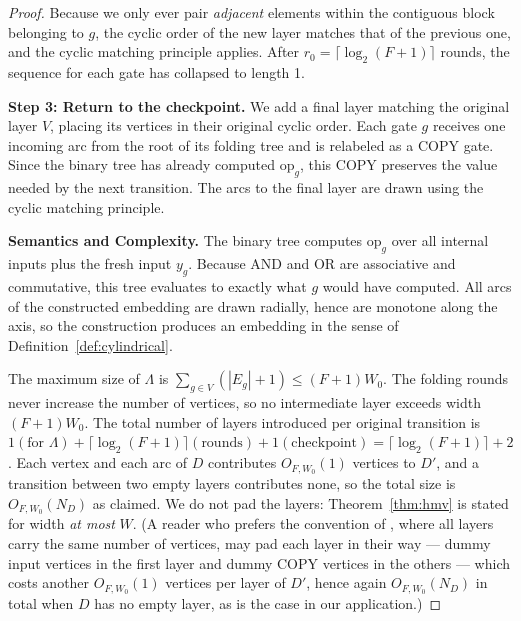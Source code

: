 \documentclass[11pt]{article}
\theoremstyle{definition}
\theoremstyle{remark}
\begin{document}
\begin{proof}
Because we only ever pair \emph{adjacent} elements within the contiguous block belonging to $g$, the cyclic order of the new layer matches that of the previous one, and the cyclic matching principle applies. After $r_0 = \lceil\log_2 (F+1)\rceil$ rounds, the sequence for each gate has collapsed to length 1.

\textbf{Step 3: Return to the checkpoint.} We add a final layer matching the original layer $V$, placing its vertices in their original cyclic order. Each gate $g$ receives one incoming arc from the root of its folding tree and is relabeled as a $\mathrm{COPY}$ gate. Since the binary tree has already computed $\mathrm{op}_g$, this $\mathrm{COPY}$ preserves the value needed by the next transition. The arcs to the final layer are drawn using the cyclic matching principle.

\textbf{Semantics and Complexity.} The binary tree computes $\mathrm{op}_g$ over all internal inputs plus the fresh input $y_g$. Because $\mathrm{AND}$ and $\mathrm{OR}$ are associative and commutative, this tree evaluates to exactly what $g$ would have computed. All arcs of the constructed embedding are drawn radially, hence are monotone along the axis, so the construction produces an embedding in the sense of Definition~\ref{def:cylindrical}.

The maximum size of $\Lambda$ is $\sum_{g\in V}(|E_g|+1) \le (F+1)W_0$. The folding rounds never increase the number of vertices, so no intermediate layer exceeds width $(F+1)W_0$. The total number of layers introduced per original transition is $1 (\text{for } \Lambda) + \lceil\log_2(F+1)\rceil (\text{rounds}) + 1 (\text{checkpoint}) = \lceil\log_2(F+1)\rceil+2$. Each vertex and each arc of $D$ contributes $O_{F,W_0}(1)$ vertices to $D'$, and a transition between two empty layers contributes none, so the total size is $O_{F,W_0}(N_D)$ as claimed. We do not pad the layers: Theorem~\ref{thm:hmv} is stated for width \emph{at most} $W$. (A reader who prefers the convention of \cite{HMV02}, where all layers carry the same number of vertices, may pad each layer in their way --- dummy input vertices in the first layer and dummy $\mathrm{COPY}$ vertices in the others --- which costs another $O_{F,W_0}(1)$ vertices per layer of $D'$, hence again $O_{F,W_0}(N_D)$ in total when $D$ has no empty layer, as is the case in our application.)
\end{proof}
\end{document}
